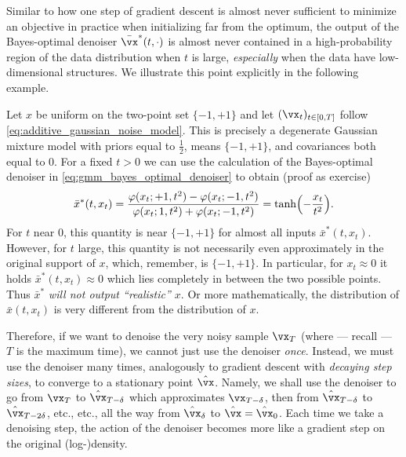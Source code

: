 \documentclass[../../book-main.tex]{subfiles}
\begin{document}
Similar to how one step of gradient descent is almost never sufficient to
minimize an objective in practice when initializing far from the optimum, the
output of the Bayes-optimal denoiser \(\bar{\vx}^{\ast}(t, \cdot)\) is almost never contained in a high-probability region of the data distribution when \(t\) is large, \textit{especially} when the data have low-dimensional structures. We illustrate this point explicitly in the following example.
\begin{example}\label{example:denoising_twopoints}
	Let \(x\) be uniform on the two-point set \(\{-1, +1\}\) and let \((\vx_{t})_{t \in [0, T]}\) follow \eqref{eq:additive_gaussian_noise_model}. This is precisely a degenerate Gaussian mixture model with priors equal to \(\frac{1}{2}\), means \(\{-1, +1\}\), and covariances both equal to \(0\). For a fixed \(t > 0\) we can use the calculation of the Bayes-optimal denoiser in \eqref{eq:gmm_bayes_optimal_denoiser} to obtain (proof as exercise)
	\begin{equation}
		\bar{x}^{\ast}(t, x_{t}) = \frac{\phi(x_{t} ; +1, t^{2}) - \phi(x_{t}
		; -1, t^{2})}{\phi(x_{t} ; 1, t^{2}) + \phi(x_{t} ; -1, t^{2})} = \tanh\rp{-\frac{x_{t}}{t^{2}}}.
	\end{equation}
	For \(t\) near \(0\), this quantity is near \(\{-1, +1\}\) for almost all inputs \(\bar{x}^{\ast}(t, x_{t})\). However, for \(t\) large, this quantity is not necessarily even approximately in the original support of \(x\), which, remember, is \(\{-1, +1\}\). In particular, for \(x_{t} \approx 0\) it holds \(\bar{x}^{\ast}(t, x_{t}) \approx 0\) which lies completely in between the two possible points. Thus \(\bar{x}^{\ast}\) \textit{will not output ``realistic'' \(x\)}. Or more mathematically, the distribution of \(\bar{x}(t, x_{t})\) is very different from the distribution of \(x\).
\end{example}

Therefore, if we want to denoise the very noisy sample \(\vx_{T}\) (where --- recall --- \(T\) is the maximum time), we cannot just use the denoiser \textit{once}. Instead, we must use the denoiser many times, analogously to gradient descent with \textit{decaying step sizes}, to converge to a stationary point \(\hat{\vx}\). Namely, we shall use the denoiser to go from \(\vx_{T}\) to \(\hat{\vx}_{T - \delta}\) which approximates \(\vx_{T - \delta}\), then from \(\hat{\vx}_{T - \delta}\) to \(\hat{\vx}_{T - 2\delta}\), etc., etc., all the way from \(\hat{\vx}_{\delta}\) to \(\hat{\vx} = \hat{\vx}_{0}\). Each time we take a denoising step, the action of the denoiser becomes more like a gradient step on the original (log-)density. 
\end{document}
